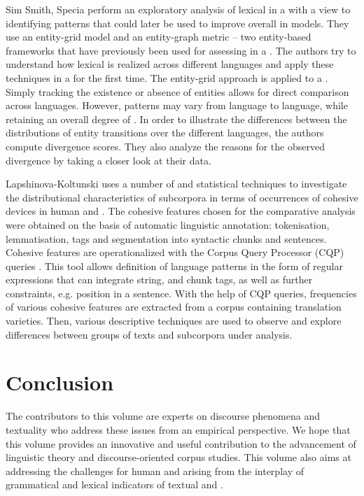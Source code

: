 \documentclass[output=paper]{langsci/langscibook.cls}
\begin{document}
	Sim Smith, Specia perform an exploratory analysis of lexical  in a  with a view to identifying patterns that could later be used to improve overall  in  models. They use an entity-grid model and an entity-graph metric -- two entity-based frameworks that have previously been used for assessing  in a . The authors try to understand how lexical  is realized across different languages and apply these techniques in a  for the first time. The entity-grid approach is applied to a . Simply tracking the existence or absence of entities allows for direct comparison across languages. However,  patterns may vary from language to language, while retaining an overall degree of . In order to illustrate the differences between the distributions of entity transitions over the different languages, the authors compute divergence scores. They also analyze the reasons for the observed divergence by taking a closer look at their data.
	
	Lapshinova-Koltunski uses a number of  and statistical techniques to investigate the distributional characteristics of subcorpora in terms of occurrences of cohesive devices in human and . The cohesive features chosen for the comparative analysis were obtained on the basis of automatic linguistic annotation: tokenisation, lemmatisation,  tags and segmentation into syntactic chunks and sentences. Cohesive features are operationalized with the Corpus Query Processor (CQP) queries \citep{Evert2010}. This tool allows definition of language patterns in the form of regular expressions that can integrate string,  and chunk tags, as well as further constraints, e.g. position in a sentence. With the help of CQP queries, frequencies of various cohesive features are extracted from a corpus containing translation varieties. Then, various descriptive techniques are used to observe and explore differences between groups of texts and subcorpora under analysis.
	
	
	\section{Conclusion}
The contributors to this volume are experts on discourse phenomena and textuality who address these issues from an empirical perspective. We hope that this volume provides an innovative and useful contribution to the advancement of linguistic theory and discourse-oriented corpus studies. This volume also aims at addressing the challenges for human and  arising from the interplay of grammatical and lexical indicators of textual  and . 
		
\end{document}
